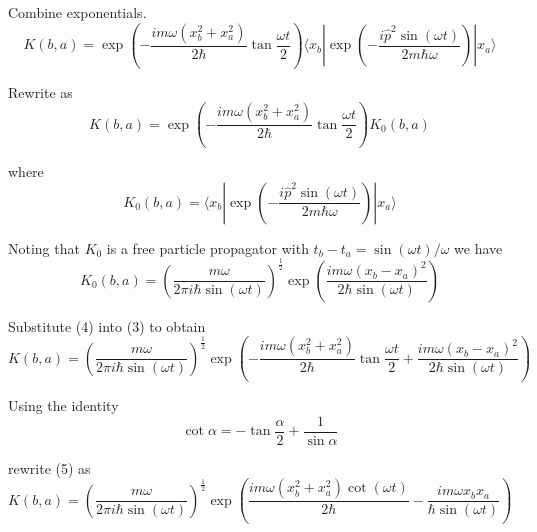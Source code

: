 Combine exponentials.
\begin{equation*}
K(b,a)=\exp\left(-\frac{im\omega(x_b^2+x_a^2)}{2\hbar}\tan\frac{\omega t}{2}\right)
\langle x_b|
\exp\left(-\frac{i\hat p^2\sin(\omega t)}{2m\hbar\omega}\right)
|x_a\rangle
\end{equation*}

Rewrite as
\begin{equation*}
K(b,a)=\exp\left(-\frac{im\omega(x_b^2+x_a^2)}{2\hbar}\tan\frac{\omega t}{2}\right)K_0(b,a)
\tag{3}
\end{equation*}

where
\begin{equation*}
K_0(b,a)=\langle x_b|\exp\left(-\frac{i\hat p^2\sin(\omega t)}{2m\hbar\omega}\right)|x_a\rangle
\end{equation*}

Noting that $K_0$ is a free particle propagator with $t_b-t_a=\sin(\omega t)/\omega$ we have
\begin{equation*}
K_0(b,a)=\left(\frac{m\omega}{2\pi i\hbar\sin(\omega t)}\right)^\frac{1}{2}
\exp\left(\frac{im\omega(x_b-x_a)^2}{2\hbar\sin(\omega t)}\right)
\tag{4}
\end{equation*}

Substitute (4) into (3) to obtain
\begin{equation*}
K(b,a)=\left(\frac{m\omega}{2\pi i\hbar\sin(\omega t)}\right)^\frac{1}{2}
\exp\left(-\frac{im\omega(x_b^2+x_a^2)}{2\hbar}\tan\frac{\omega t}{2}
+\frac{im\omega(x_b-x_a)^2}{2\hbar\sin(\omega t)}\right)
\tag{5}
\end{equation*}

Using the identity
\begin{equation*}
\cot\alpha=-\tan\frac{\alpha}{2}+\frac{1}{\sin\alpha}
\end{equation*}

rewrite (5) as
\begin{equation*}
K(b,a)=\left(\frac{m\omega}{2\pi i\hbar\sin(\omega t)}\right)^\frac{1}{2}
\exp\left(\frac{im\omega(x_b^2+x_a^2)\cot(\omega t)}{2\hbar}
-\frac{im\omega x_bx_a}{\hbar\sin(\omega t)}\right)
\tag{6}
\end{equation*}


